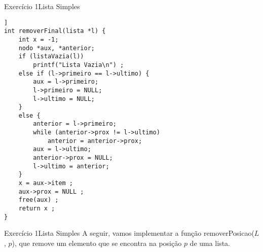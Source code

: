 \documentclass[aspectratio=169]{beamer}
\begin{document}

\begin{frame}[fragile]{Exercício 1}{Lista Simples}
\begin{lstlisting}[style=CStyle,basicstyle=\tiny]]
int removerFinal(lista *l) {
    int x = -1;
    nodo *aux, *anterior;
    if (listaVazia(l))
        printf("Lista Vazia\n") ;
    else if (l->primeiro == l->ultimo) {
        aux = l->primeiro;
        l->primeiro = NULL;
        l->ultimo = NULL;
    }
    else {
        anterior = l->primeiro;
        while (anterior->prox != l->ultimo)
            anterior = anterior->prox;
        aux = l->ultimo;
        anterior->prox = NULL;
        l->ultimo = anterior;
    }
    x = aux->item ;
    aux->prox = NULL ;
    free(aux) ;
    return x ;
}
\end{lstlisting}  
\end{frame}


\begin{frame}[fragile]{Exercício 1}{Lista Simples}
A seguir, vamos implementar a função removerPosicao($L$, $p$), que remove um elemento que se encontra na posição $p$ de uma lista.
\end{frame}

\end{document}
